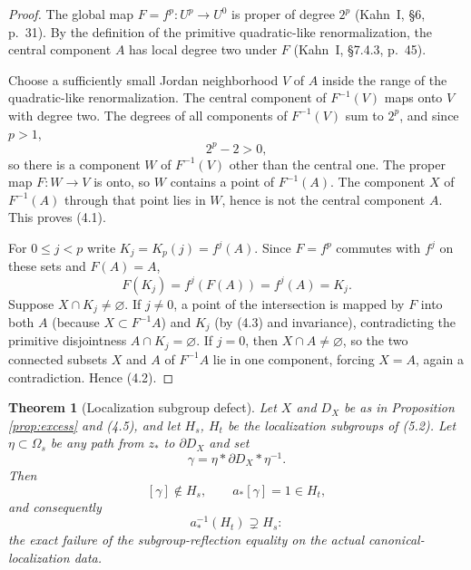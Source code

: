 \documentclass[11pt,reqno]{amsart}
\newtheorem{theorem}{Theorem}[section]
\theoremstyle{definition}
\theoremstyle{remark}
\begin{document}
\begin{proof}
The global map \(F=f^p\colon U^p\to U^0\) is proper of degree \(2^p\) (Kahn~I, \S6, p.~31).  By the definition of the primitive quadratic-like renormalization, the central component \(A\) has local degree two under \(F\) (Kahn~I, \S7.4.3, p.~45).

Choose a sufficiently small Jordan neighborhood \(V\) of \(A\) inside the range of the quadratic-like renormalization.  The central component of \(F^{-1}(V)\) maps onto \(V\) with degree two.  The degrees of all components of \(F^{-1}(V)\) sum to \(2^p\), and since \(p>1\),
\[
 2^p-2>0,
\]
so there is a component \(W\) of \(F^{-1}(V)\) other than the central one.  The proper map \(F\colon W\to V\) is onto, so \(W\) contains a point of \(F^{-1}(A)\).  The component \(X\) of \(F^{-1}(A)\) through that point lies in \(W\), hence is not the central component \(A\).  This proves (4.1).

For \(0\le j<p\) write \(K_j=K_p(j)=f^j(A)\).  Since \(F=f^p\) commutes with \(f^j\) on these sets and \(F(A)=A\),
\[
 F(K_j)=f^j(F(A))=f^j(A)=K_j.                       \tag{4.3}
\]
Suppose \(X\cap K_j\ne\varnothing\).  If \(j\ne0\), a point of the intersection is mapped by \(F\) into both \(A\) (because \(X\subset F^{-1}A\)) and \(K_j\) (by (4.3) and invariance), contradicting the primitive disjointness \(A\cap K_j=\varnothing\).  If \(j=0\), then \(X\cap A\ne\varnothing\), so the two connected subsets \(X\) and \(A\) of \(F^{-1}A\) lie in one component, forcing \(X=A\), again a contradiction.  Hence (4.2).
\end{proof}
\begin{theorem}[Localization subgroup defect]\label{thm:subgroup-defect}
Let \(X\) and \(D_X\) be as in Proposition \ref{prop:excess} and (4.5), and let \(H_s\), \(H_t\) be the localization subgroups of (5.2).  Let \(\eta\subset\Omega_s\) be any path from \(z_*\) to \(\partial D_X\) and set
\[
 \gamma=\eta*\partial D_X*\eta^{-1}.       \tag{5.3}
\]
Then
\[
 [\gamma]\notin H_s,\qquad a_*[\gamma]=1\in H_t,
\]
and consequently
\[
 a_*^{-1}(H_t)\supsetneq H_s:                          \tag{5.7}
\]
the exact failure of the subgroup-reflection equality on the actual canonical-localization data.
\end{theorem}
\end{document}

